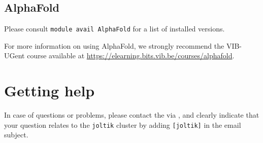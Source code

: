 



\subsection{AlphaFold}
\label{sec:gpu_ugent_software_alphafold}

Please consult \lstinline|module avail AlphaFold| for a list of installed versions.

For more information on using AlphaFold, we strongly recommend the VIB-UGent course
available at \url{https://elearning.bits.vib.be/courses/alphafold}.


\section{Getting help}
\label{sec:gpu_ugent_help}

In case of questions or problems, please contact the \hpcTeam via \hpcinfo, and clearly indicate that your question
relates to the \lstinline|joltik| cluster by adding \lstinline|[joltik]| in the email subject.
